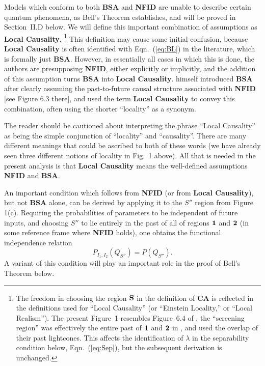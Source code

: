 \documentclass[rmp, aps, preprint, longbibliography]{revtex4-1}
\newcommand{\eq}[1]{{Eqn.~(\ref{#1})}}
\begin{document}
Models which conform to both {\bf BSA} and {\bf NFID} are unable to describe certain quantum phenomena, as Bell's Theorem establishes, and will be proved in Section~II.D below.  We will define this important combination of assumptions as {\bf Local Causality}.%
\footnote{The freedom in choosing the region $\bf{S}$ in the definition of {\bf CA} is reflected in the definitions used for ``Local Causality'' (or ``Einstein Locality,'' or ``Local Realism'').  The present Figure~1 resembles Figure~6.4 of \textcite{bell1990}, the ``screening region'' was effectively the entire past of $\bf 1$ and $\bf 2$ in \textcite{bell1981}, and \textcite{bell1976b} used the overlap of their past lightcones.  This affects the identification of $\lambda$ in the separability condition below, Eqn.~(\ref{eq:Sep}), but the subsequent derivation is unchanged.}
This definition may cause some initial confusion, because {\bf Local Causality} is often identified with \eq{eq:BL} in the literature, which is formally just {\bf BSA}.  However, in essentially all cases in which this is done, the authors are presupposing {\bf NFID}, {either explicitly or implicitly,} and the addition of this assumption turns {\bf BSA} into {\bf Local Causality}.  \textcite{bell1990} himself introduced {\bf BSA} after clearly assuming the past-to-future causal structure associated with {\bf NFID} [see Figure 6.3 there], and used the term {\bf Local Causality} to convey this combination, often using the shorter ``locality'' as a synonym.

The reader should be cautioned about interpreting the phrase ``Local Causality'' as being the simple conjunction of ``locality'' and ``causality''.  There are many different meanings that could be ascribed to both of these words (we have already seen three different notions of locality in Fig.~1 above).   All that is needed in the present analysis is that {\bf Local Causality} means the well-defined assumptions {\bf NFID} and {\bf BSA}.

An important condition which follows from {\bf NFID} (or from {\bf Local Causality}), but not {\bf BSA} alone, can be derived by applying it to the $S''$ region from Figure 1(c).  Requiring the probabilities of parameters to be independent of future inputs, and choosing $S''$ to lie entirely in the past of all of regions $\bf{1}$ and $\bf{2}$ (in some reference frame where {\bf NFID} holds), one obtains the functional independence relation
\begin{equation}
\label{eq:SI2}
P_{I_1,I_2}(Q_{S''}) = P(Q_{S''}) .
\end{equation}
A variant of this condition will play an important role in the proof of Bell's Theorem below.
\end{document}
